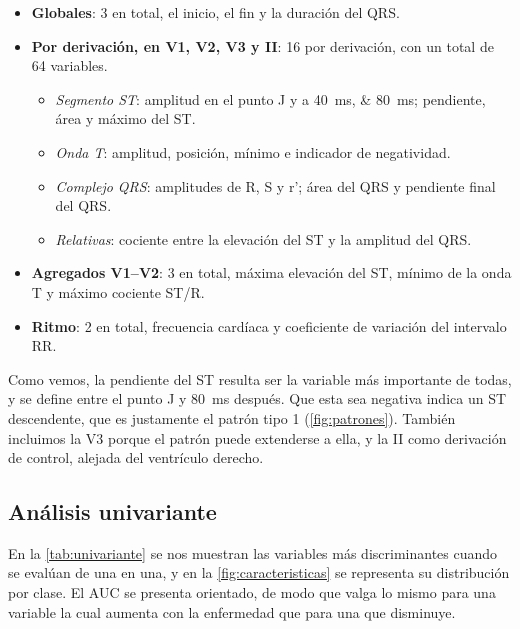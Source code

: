 \begin{itemize}
  \item \textbf{Globales}: 3 en total, el inicio, el fin y la duración del QRS.
  \item \textbf{Por derivación, en V1, V2, V3 y II}: 16 por derivación, con un total de 64 variables.
  \begin{itemize}
    \item \emph{Segmento ST}: amplitud en el punto J y a \SIlist{40;80}{\milli\second}; pendiente, área y máximo del ST.
    \item \emph{Onda T}: amplitud, posición, mínimo e indicador de negatividad.
    \item \emph{Complejo QRS}: amplitudes de R, S y r'; área del QRS y pendiente final del QRS.
    \item \emph{Relativas}: cociente entre la elevación del ST y la amplitud del QRS.
  \end{itemize}
  \item \textbf{Agregados V1--V2}: 3 en total, máxima elevación del ST, mínimo de la onda T y máximo cociente ST/R.
  \item \textbf{Ritmo}: 2 en total, frecuencia cardíaca y coeficiente de variación del intervalo RR.
\end{itemize}

Como vemos, la pendiente del ST resulta ser la variable más importante de todas, y se define entre el punto J y \SI{80}{\milli\second} después. Que esta sea negativa indica un ST descendente, que es justamente el patrón tipo 1 (\cref{fig:patrones}). También incluimos la V3 porque el patrón puede extenderse a ella, y la II como derivación de control, alejada del ventrículo derecho.

\subsection{Análisis univariante}

En la \cref{tab:univariante} se nos muestran las variables más discriminantes cuando se evalúan de una en una, y en la \cref{fig:caracteristicas} se representa su distribución por clase. El AUC se presenta orientado, de modo que valga lo mismo para una variable la cual aumenta con la enfermedad que para una que disminuye.

